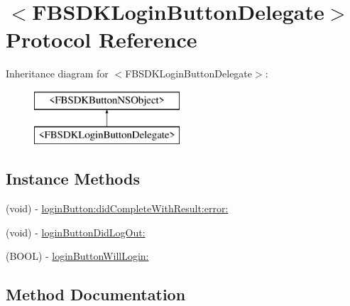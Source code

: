 \hypertarget{protocol_f_b_s_d_k_login_button_delegate-p}{}\section{$<$F\+B\+S\+D\+K\+Login\+Button\+Delegate$>$ Protocol Reference}
\label{protocol_f_b_s_d_k_login_button_delegate-p}
Inheritance diagram for $<$F\+B\+S\+D\+K\+Login\+Button\+Delegate$>$\+:\begin{figure}[H]
\begin{center}
\leavevmode
\includegraphics[height=2.000000cm]{protocol_f_b_s_d_k_login_button_delegate-p}
\end{center}
\end{figure}
\subsection*{Instance Methods}
\begin{DoxyCompactItemize}
\item 
(void) -\/ \hyperlink{protocol_f_b_s_d_k_login_button_delegate-p_aa50925943f306f510831696587f85f2e}{login\+Button\+:did\+Complete\+With\+Result\+:error\+:}
\item 
(void) -\/ \hyperlink{protocol_f_b_s_d_k_login_button_delegate-p_ad28c4d44ec4407039914f1d329b79ac4}{login\+Button\+Did\+Log\+Out\+:}
\item 
(B\+O\+O\+L) -\/ \hyperlink{protocol_f_b_s_d_k_login_button_delegate-p_a44b67647f87de22d26325ca8632562c0}{login\+Button\+Will\+Login\+:}
\end{DoxyCompactItemize}


\subsection{Method Documentation}
\hypertarget{protocol_f_b_s_d_k_login_button_delegate-p_aa50925943f306f510831696587f85f2e}{}
